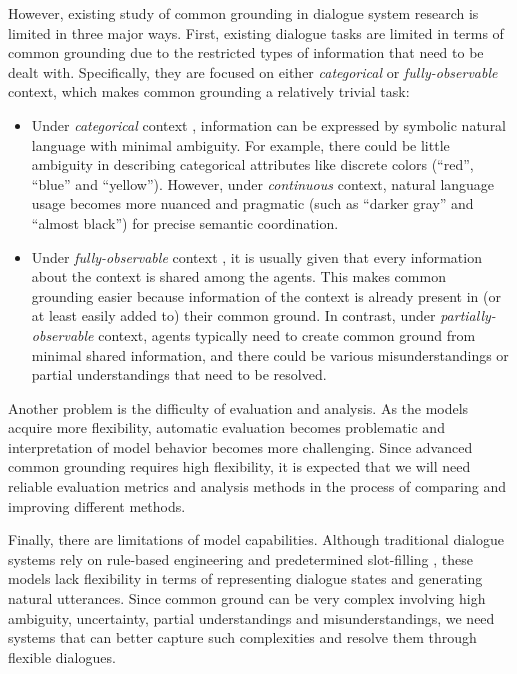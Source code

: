 However, existing study of common grounding in dialogue system research is limited in three major ways. First, existing dialogue tasks are limited in terms of common grounding due to the restricted types of information that need to be dealt with. Specifically, they are focused on either \emph{categorical} or \emph{fully-observable} context, which makes common grounding a relatively trivial task:

\begin{itemize}
  \item Under \emph{categorical} context \citep{bordes2017learning,he2017learning,lewis-etal-2017-deal}, information can be expressed by symbolic natural language with minimal ambiguity. For example, there could be little ambiguity in describing categorical attributes like discrete colors (``red'', ``blue'' and ``yellow''). However, under \emph{continuous} context, natural language usage becomes more nuanced and pragmatic (such as ``darker gray'' and ``almost black'') for precise semantic coordination.
  \item Under \emph{fully-observable} context \citep{zarriess-etal-2016-pentoref,de2017guesswhat}, it is usually given that every information about the context is shared among the agents. This makes common grounding easier because information of the context is already present in (or at least easily added to) their common ground. In contrast, under \emph{partially-observable} context, agents typically need to create common ground from minimal shared information, and there could be various misunderstandings or partial understandings that need to be resolved.
\end{itemize}

Another problem is the difficulty of evaluation and analysis. As the models acquire more flexibility, automatic evaluation becomes problematic \citep{liu2016,novikova2017} and interpretation of model behavior becomes more challenging. Since advanced common grounding requires high flexibility, it is expected that we will need reliable evaluation metrics and analysis methods in the process of comparing and improving different methods.

Finally, there are limitations of model capabilities. Although traditional dialogue systems rely on rule-based engineering and predetermined slot-filling \citep{traum1994computational,young2013pomdp,williams2016dialog}, these models lack flexibility in terms of representing dialogue states and generating natural utterances. Since common ground can be very complex involving high ambiguity, uncertainty, partial understandings and misunderstandings, we need systems that can better capture such complexities and resolve them through flexible dialogues.


